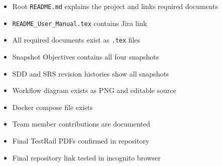 \documentclass[11pt]{article}
\begin{document}
\begin{itemize}[leftmargin=*]
  \item[$\checkmark$] Root \texttt{README.md} explains the project and links required documents
  \item[$\checkmark$] \texttt{README\_User\_Manual.tex} contains Jira link
  \item[$\checkmark$] All required documents exist as \texttt{.tex} files
  \item[$\checkmark$] Snapshot Objectives contains all four snapshots
  \item[$\checkmark$] SDD and SRS revision histories show all snapshots
  \item[$\checkmark$] Workflow diagram exists as PNG and editable source
  \item[$\checkmark$] Docker compose file exists
  \item[$\checkmark$] Team member contributions are documented
  \item[$\checkmark$] Final TestRail PDFs confirmed in repository
  \item[$\checkmark$] Final repository link tested in incognito browser
\end{itemize}
\end{document}
